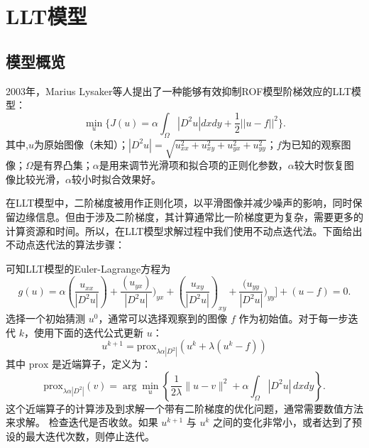 \titleformat{\chapter}[hang]{\linespread{1}\heiti\sanhao\bfseries\filright}{\thechapter}{1em}{}{}
\chapter{LLT模型}
\section{模型概览}
2003年，Marius Lysaker等人提出了一种能够有效抑制ROF模型阶梯效应的LLT模型\cite{lysaker2003noise}：
\begin{equation}
    \min _{u}\{J(u)=\alpha \int _{\Omega}|D^{2}u|dxdy+\frac{1}{2}||u-f||^{2}\}.
    \tag{16}
\end{equation}
其中,$u$为原始图像（未知）；$|D^{2}u|=\sqrt{u_{xx}^{2}+u_{xy}^{2}+u_{yx}^{2}+u_{yy}^{2}}$；$f$为已知的观察图像；$\Omega$是有界凸集；$\alpha$是用来调节光滑项和拟合项的正则化参数，$\alpha$较大时恢复图像比较光滑，$\alpha$较小时拟合效果好。

在LLT模型中，二阶梯度被用作正则化项，以平滑图像并减少噪声的影响，同时保留边缘信息。但由于涉及二阶梯度，其计算通常比一阶梯度更为复杂，需要更多的计算资源和时间。所以，在LLT模型求解过程中我们使用不动点迭代法。下面给出不动点迭代法的算法步骤\cite{rezaiee2023evaluation}：

可知LLT模型的Euler-Lagrange方程为
\begin{equation}
    g(u)=\alpha (\frac{u_{xx}}{|D^{2}u|})+\frac{(u_{yx})}{|D^{2}u|})_{yx}+(\frac{u_{xy}}{|D^{2}u|})_{xy}+\frac{(u_{yy}}{|D^{2}u|})_{yy}]+(u-f)=0.
    \tag{17}
\end{equation}
选择一个初始猜测 $u^0$，通常可以选择观察到的图像 $f$ 作为初始值。对于每一步迭代 $k$，使用下面的迭代公式更新 $u$：
\begin{equation}
    u^{k+1} = \text{prox}_{\lambda \alpha |D^2|}(u^k + \lambda (u^k - f))
    \tag{18}
\end{equation}
其中 $\text{prox}$ 是近端算子，定义为：
\begin{equation}
    \text{prox}_{\lambda \alpha |D^2|}(v) = \arg\min_u \left\{ \frac{1}{2\lambda} \|u - v\|^2 + \alpha \int_{\Omega} |D^2 u| \, dxdy \right\}.
    \tag{19}
\end{equation}
这个近端算子的计算涉及到求解一个带有二阶梯度的优化问题，通常需要数值方法来求解。
检查迭代是否收敛。如果 $u^{k+1}$ 与 $u^k$ 之间的变化非常小，或者达到了预设的最大迭代次数，则停止迭代。


